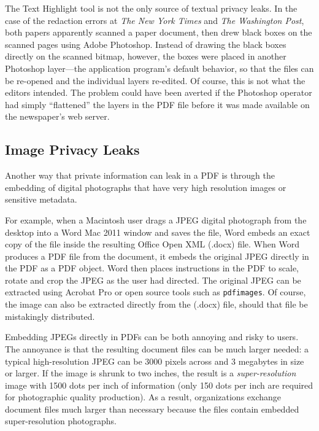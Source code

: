 The Text Highlight tool is not the only source of textual privacy
leaks. In the case of the redaction errors at \emph{The New York
  Times} and \emph{The Washington Post}, both papers apparently
scanned a paper document, then
drew black boxes on the scanned pages using Adobe Photoshop.  Instead of drawing the black boxes directly on the
scanned bitmap, however, the boxes were placed in another Photoshop
layer---the application program's default behavior, so that
the files can be re-opened and the individual layers re-edited. Of course, this is not what
the editors intended. The problem could have
been averted if the Photoshop operator had simply ``flattened'' the
layers in the PDF file before it was made available on the newspaper's web server\cite[p.152]{internet-forensics}.


\subsection{Image Privacy Leaks}

Another way that private information can leak in a PDF is through the
embedding of digital photographs that have very high resolution images or
sensitive metadata.

For example, when a Macintosh user drags a JPEG digital photograph
from the desktop into a Word Mac 2011 window and saves the file, Word
embeds an exact copy of the file inside the resulting Office Open XML
(.docx) file. When Word produces a PDF file from the document, it
embeds the original JPEG directly in the PDF as a PDF object. Word
then places instructions in the PDF to scale, rotate and crop the JPEG
as the user had directed. The original JPEG can be extracted using
Acrobat Pro or open source tools such as \texttt{pdfimages}. Of
course, the image can also be extracted directly from the (.docx)
file, should that file be mistakingly distributed.

Embedding JPEGs directly in PDFs
can be both annoying and  risky to
users. The annoyance is that the resulting document files  can
be much larger needed: a typical high-resolution JPEG
can be 3000 pixels across and 3
megabytes in size or larger. If the image is shrunk  to two
inches, the result is a \emph{super-resolution} image with 1500 dots
per inch of information (only 150 dots per inch are required for
photographic quality production). As a result,  organizations exchange
document files  much larger than necessary because the files
contain embedded super-resolution photographs. 

